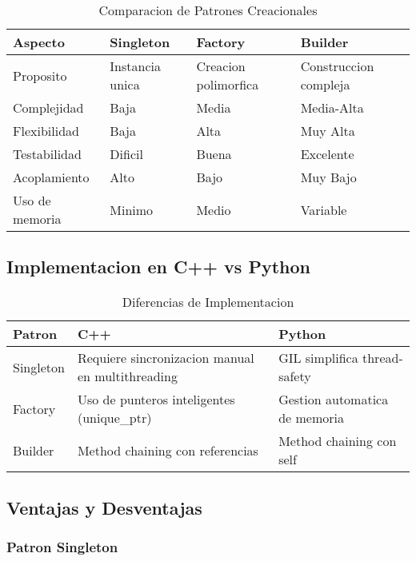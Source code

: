 \documentclass[11pt,a4paper]{article}
\begin{document}
\begin{table}[H]
\centering
\caption{Comparacion de Patrones Creacionales}
\begin{tabular}{|p{3cm}|p{3.5cm}|p{3.5cm}|p{3.5cm}|}
\hline
\textbf{Aspecto} & \textbf{Singleton} & \textbf{Factory} & \textbf{Builder} \\
\hline
Proposito & Instancia unica & Creacion polimorfica & Construccion compleja \\
\hline
Complejidad & Baja & Media & Media-Alta \\
\hline
Flexibilidad & Baja & Alta & Muy Alta \\
\hline
Testabilidad & Dificil & Buena & Excelente \\
\hline
Acoplamiento & Alto & Bajo & Muy Bajo \\
\hline
Uso de memoria & Minimo & Medio & Variable \\
\hline
\end{tabular}
\end{table}

\subsection{Implementacion en C++ vs Python}

\begin{table}[H]
\centering
\caption{Diferencias de Implementacion}
\begin{tabular}{|p{3cm}|p{5cm}|p{5cm}|}
\hline
\textbf{Patron} & \textbf{C++} & \textbf{Python} \\
\hline
Singleton & Requiere sincronizacion manual en multithreading & GIL simplifica thread-safety \\
\hline
Factory & Uso de punteros inteligentes (unique\_ptr) & Gestion automatica de memoria \\
\hline
Builder & Method chaining con referencias & Method chaining con self \\
\hline
\end{tabular}
\end{table}

\subsection{Ventajas y Desventajas}

\subsubsection{Patron Singleton}
\end{document}
